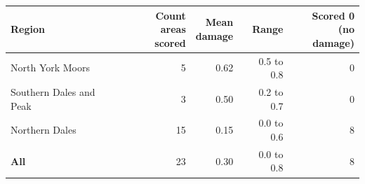 \begin{tabular}{lrrrr}
\toprule
Region & \makecell[r]{Count areas\\scored} & \makecell[r]{Mean\\damage} & Range & \makecell[r]{Scored 0\\(no damage)} \\
\midrule
North York Moors & 5 & 0.62 & 0.5 to 0.8 & 0 \\
Southern Dales and Peak & 3 & 0.50 & 0.2 to 0.7 & 0 \\
Northern Dales & 15 & 0.15 & 0.0 to 0.6 & 8 \\
\midrule
\textbf{All} & 23 & 0.30 & 0.0 to 0.8 & 8 \\
\bottomrule
\end{tabular}
